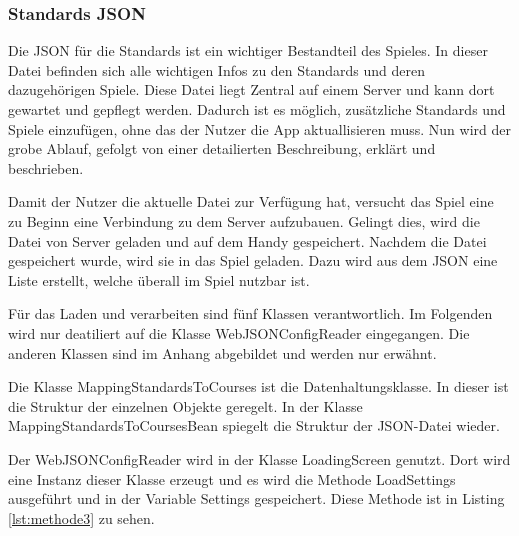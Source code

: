 		\subsubsection{Standards JSON}
			Die JSON für die Standards ist ein wichtiger Bestandteil des Spieles. In dieser Datei befinden sich alle wichtigen Infos zu den Standards und deren dazugehörigen Spiele. Diese Datei liegt Zentral auf einem Server und kann dort gewartet und gepflegt werden. Dadurch ist es möglich, zusätzliche Standards und Spiele einzufügen, ohne das der Nutzer die App aktuallisieren muss. Nun wird der grobe Ablauf, gefolgt von einer detailierten Beschreibung, erklärt und beschrieben.
	
			Damit der Nutzer die aktuelle Datei zur Verfügung hat, versucht das Spiel eine zu Beginn eine Verbindung zu dem Server aufzubauen. Gelingt dies, wird die Datei von Server geladen und auf dem Handy gespeichert. Nachdem die Datei gespeichert wurde, wird sie in das Spiel geladen. Dazu wird aus dem JSON eine Liste erstellt, welche überall im Spiel nutzbar ist.
	
			Für das Laden und verarbeiten sind fünf Klassen verantwortlich. Im Folgenden wird nur deatiliert auf die Klasse WebJSONConfigReader eingegangen. Die anderen Klassen sind im Anhang abgebildet und werden nur erwähnt.
	
			Die Klasse MappingStandardsToCourses ist die Datenhaltungsklasse. In dieser ist die Struktur der einzelnen Objekte geregelt. In der Klasse MappingStandardsToCoursesBean spiegelt die Struktur der JSON-Datei wieder. 
	
			Der WebJSONConfigReader wird in der Klasse LoadingScreen genutzt. Dort wird eine Instanz dieser Klasse erzeugt und es wird die Methode LoadSettings ausgeführt und in der Variable Settings gespeichert. Diese Methode ist in Listing \ref{lst:methode3} zu sehen.

